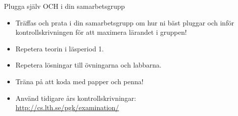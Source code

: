 \begin{Slide}{Plugga själv OCH i din samarbetsgrupp}
\begin{itemize}\SlideFontSmall
  \item Träffas och prata i din samarbetsgrupp om hur ni bäst pluggar  och  inför kontrollskrivningen för att maximera lärandet i gruppen!

  \item Repetera teorin i läsperiod 1.
  
  \item Repetera lösningar till övningarna och labbarna.

  \item Träna på att koda med papper och penna!

  \item Använd tidigare års kontrollskrivningar: \\ \url{http://cs.lth.se/pgk/examination/}

\pause



\end{itemize}
\end{Slide}



